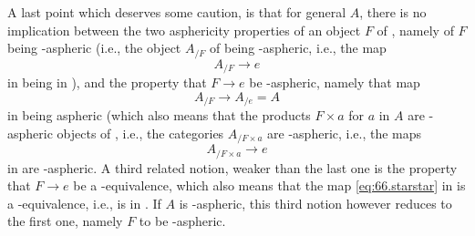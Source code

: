 A last point which deserves some caution, is that for general $A$,
there is no implication between the two asphericity properties of an
object $F$ of \Ahat, namely of $F$ being \scrW-aspheric (i.e., the
object $A_{/F}$ of \Cat{} being \scrW-aspheric, i.e., the map
\begin{equation}
  \label{eq:66.*}
  A_{/F} \to e\tag{*}
\end{equation}
in \Cat{} being in \scrW), and the property that $F\to e$ be
\scrW-aspheric, namely that map
\begin{equation}
  \label{eq:66.starstar}
  A_{/F} \to A_{/e}=A\tag{**}
\end{equation}
in \Cat{} being aspheric (which also means that the products $F\times
a$ for $a$ in $A$ are \scrW-aspheric objects of \Ahat, i.e., the
categories $A_{/F\times a}$ are \scrW-aspheric, i.e., the maps
\[ A_{/F\times a} \to e\]
in \Cat{} are \scrW-aspheric. A third related notion, weaker than the
last one is the property that $F\to e$ be a
\scrW-equivalence, which also means that the map
\eqref{eq:66.starstar} in \Cat{} is a \scrW-equivalence, i.e., is in
\scrW. If $A$ is \scrW-aspheric, this third notion however reduces to
the first one, namely $F$ to be \scrW-aspheric.

